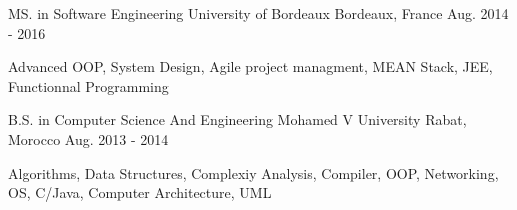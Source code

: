 \begin{cventries}
  \cventry
    {MS. in Software Engineering}
    {University of Bordeaux}
    {Bordeaux, France}
    {Aug. 2014 - 2016}
    {
      \begin{cvitems}
        \item {Advanced OOP, System Design, Agile project managment, MEAN Stack, JEE, Functionnal Programming}
      \end{cvitems}
    }
   \cventry
    {B.S. in Computer Science And Engineering}
    {Mohamed V University}
    {Rabat, Morocco}
    {Aug. 2013 - 2014}
    {
      \begin{cvitems}
        \item {Algorithms, Data Structures, Complexiy Analysis, Compiler, OOP, Networking, OS, C/Java, Computer Architecture, UML}
      \end{cvitems}
    }
\end{cventries}
